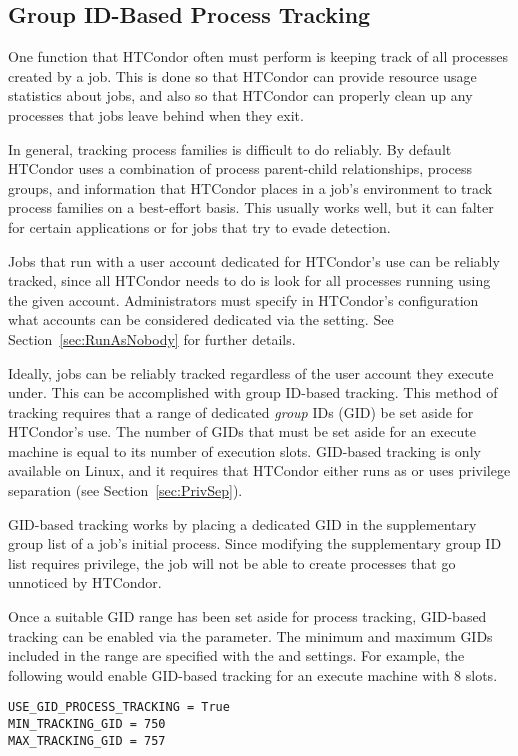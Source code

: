 \subsection{\label{sec:GroupTracking}Group ID-Based Process Tracking} 

One function that HTCondor often must perform is keeping track of all
processes created by a job. This is done so that HTCondor can provide
resource usage statistics about jobs, and also so that HTCondor can properly
clean up any processes that jobs leave behind when they exit.

In general, tracking process families is difficult to do reliably.
By default HTCondor uses a combination of process parent-child
relationships, process groups, and information that HTCondor places in a
job's environment to track process families on a best-effort
basis. This usually works well, but it can falter for certain
applications or for jobs that try to evade detection.

Jobs that run with a user account dedicated for HTCondor's use
can be reliably tracked, since all HTCondor needs to do is look for all
processes running using the given account. Administrators must specify
in HTCondor's configuration what accounts can be considered dedicated
via the  setting. See
Section~\ref{sec:RunAsNobody} for further details.

Ideally, jobs can be reliably tracked regardless of the user account
they execute under. This can be accomplished with group ID-based
tracking. This method of tracking requires that a range of dedicated
\emph{group} IDs (GID) be set aside for HTCondor's use. The number of GIDs
that must be set aside for an execute machine is equal to its number
of execution slots. GID-based tracking is only available on Linux, and
it requires that HTCondor either runs as  or uses privilege
separation (see Section~\ref{sec:PrivSep}).

GID-based tracking works by placing a dedicated GID in the
supplementary group list of a job's initial process. Since modifying
the supplementary group ID list requires
 privilege, the job will not be able to create processes
that go unnoticed by HTCondor.

Once a suitable GID range has been set aside for process tracking,
GID-based tracking can be enabled via the
 parameter. The minimum and maximum
GIDs included in the range are specified with the
 and 
settings. For example, the following would enable GID-based tracking
for an execute machine with 8 slots.
\begin{verbatim}
USE_GID_PROCESS_TRACKING = True
MIN_TRACKING_GID = 750
MAX_TRACKING_GID = 757
\end{verbatim}

